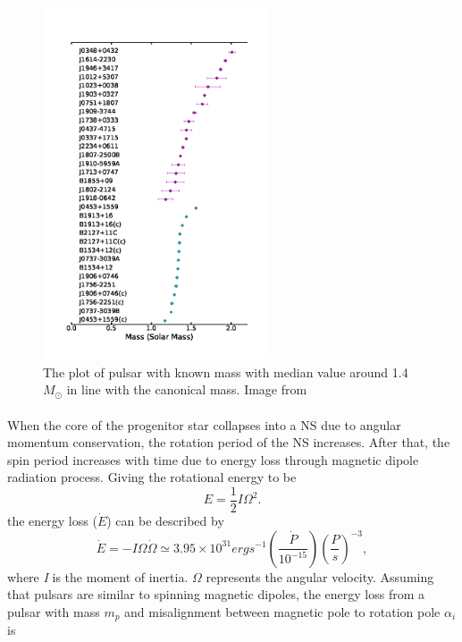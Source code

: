 \documentclass[thesis_msc.tex]{subfiles}
\begin{document}
        \begin{figure}[h!] \centering
\includegraphics[width=0.6\textwidth]{figures/mass.png}
\caption{The plot of pulsar with known mass with median value around 1.4 $M_\odot$ in line with the canonical mass. Image from \cite{antoniadis2016millisecond}}
\label{mass}
\end{figure}

    \paragraph{} When the core of the progenitor star collapses into a NS due to angular momentum conservation, the rotation period of the NS increases. After that, the spin period increases with time due to energy loss through magnetic dipole radiation process. Giving the rotational energy to be %
    \begin{equation}
    E=\frac{1}{2} I \Omega^2.
    \end{equation}
    the energy loss ($\dot{E}$) can be described by 
    \begin{equation}
    \dot{E}=-I\Omega\dot{\Omega}\simeq 3.95\times10^{31}erg s^{-1} (\frac{\dot{P}}{10^{-15}})(\frac{P}{s})^{-3},
    \end{equation}
    where \textit{I} is the moment of inertia. $\Omega$ represents the angular velocity. Assuming that pulsars are similar to spinning magnetic dipoles, the energy loss from  a pulsar with mass $m_p$ and misalignment between magnetic pole to rotation pole $\alpha_i$ is 
   
\end{document}
